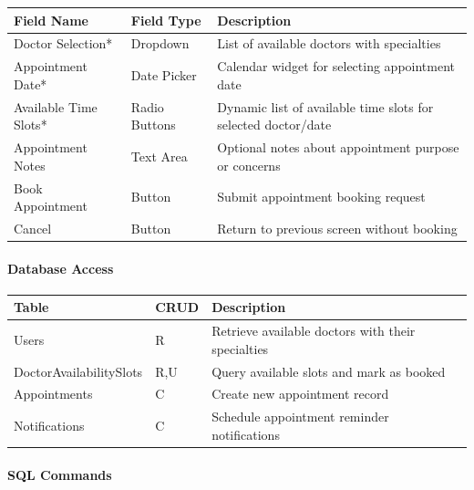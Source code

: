 \documentclass[12pt,a4paper]{article}
\begin{document}
\begin{longtable}{|p{3cm}|p{3cm}|p{8cm}|}
\hline
\textbf{Field Name} & \textbf{Field Type} & \textbf{Description} \\
\hline
Doctor Selection* & Dropdown & List of available doctors with specialties \\
\hline
Appointment Date* & Date Picker & Calendar widget for selecting appointment date \\
\hline
Available Time Slots* & Radio Buttons & Dynamic list of available time slots for selected doctor/date \\
\hline
Appointment Notes & Text Area & Optional notes about appointment purpose or concerns \\
\hline
Book Appointment & Button & Submit appointment booking request \\
\hline
Cancel & Button & Return to previous screen without booking \\
\hline
\end{longtable}

\paragraph{Database Access}

\begin{longtable}{|p{3cm}|p{2cm}|p{9cm}|}
\hline
\textbf{Table} & \textbf{CRUD} & \textbf{Description} \\
\hline
Users & R & Retrieve available doctors with their specialties \\
\hline
DoctorAvailabilitySlots & R,U & Query available slots and mark as booked \\
\hline
Appointments & C & Create new appointment record \\
\hline
Notifications & C & Schedule appointment reminder notifications \\
\hline
\end{longtable}

\paragraph{SQL Commands}
\end{document}
